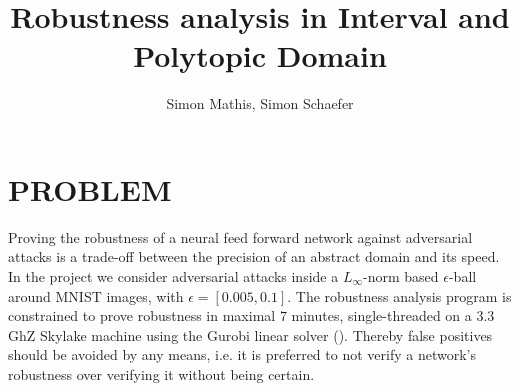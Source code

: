 \documentclass[letterpaper, 10 pt, conference]{ieeeconf}
\title{\large \bf
Robustness analysis in Interval and Polytopic Domain
}
\author{Simon Mathis, Simon Schaefer}
\begin{document}
\maketitle
\thispagestyle{empty}
\pagestyle{empty}

\section{PROBLEM}
Proving the robustness of a neural feed forward network against adversarial attacks is a trade-off between the precision of an abstract domain and its speed. In the project we consider adversarial attacks inside a $L_\infty$-norm based $\epsilon$-ball around MNIST images, with $\epsilon = [0.005, 0.1]$. The robustness analysis program is constrained to prove robustness in maximal $7$ minutes, single-threaded on a 3.3 GhZ Skylake machine using the Gurobi linear solver (\cite{c1}). Thereby false positives should be avoided by any means, i.e. it is preferred to not verify a network's robustness over verifying it without being certain. 
\end{document}
